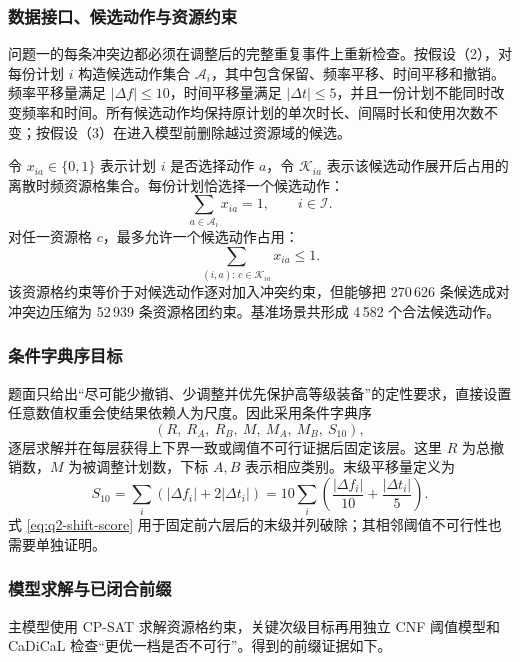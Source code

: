 \subsubsection{数据接口、候选动作与资源约束}
问题一的每条冲突边都必须在调整后的完整重复事件上重新检查。按假设（2），对每份计划 \(i\) 构造候选动作集合 \(\mathcal A_i\)，其中包含保留、频率平移、时间平移和撤销。频率平移量满足 \(\lvert\Delta f\rvert\le 10\)，时间平移量满足 \(\lvert\Delta t\rvert\le 5\)，并且一份计划不能同时改变频率和时间。所有候选动作均保持原计划的单次时长、间隔时长和使用次数不变；按假设（3）在进入模型前删除越过资源域的候选。

令 \(x_{ia}\in\{0,1\}\) 表示计划 \(i\) 是否选择动作 \(a\)，令 \(\mathcal K_{ia}\) 表示该候选动作展开后占用的离散时频资源格集合。每份计划恰选择一个候选动作：
\begin{equation}
\sum_{a\in\mathcal A_i}x_{ia}=1,\qquad i\in\mathcal I.
\label{eq:q2-one-action}
\end{equation}
对任一资源格 \(c\)，最多允许一个候选动作占用：
\begin{equation}
\sum_{(i,a):\,c\in\mathcal K_{ia}}x_{ia}\le 1.
\label{eq:q2-cell-clique}
\end{equation}
该资源格约束等价于对候选动作逐对加入冲突约束，但能够把 270\,626 条候选成对冲突边压缩为 52\,939 条资源格团约束。基准场景共形成 4\,582 个合法候选动作。

\subsubsection{条件字典序目标}
题面只给出“尽可能少撤销、少调整并优先保护高等级装备”的定性要求，直接设置任意数值权重会使结果依赖人为尺度。因此采用条件字典序
\begin{equation}
(R,\ R_A,\ R_B,\ M,\ M_A,\ M_B,\ S_{10}),
\label{eq:q2-lexicographic}
\end{equation}
逐层求解并在每层获得上下界一致或阈值不可行证据后固定该层。这里 \(R\) 为总撤销数，\(M\) 为被调整计划数，下标 \(A,B\) 表示相应类别。末级平移量定义为
\begin{equation}
S_{10}=\sum_i\left(\lvert\Delta f_i\rvert+2\lvert\Delta t_i\rvert\right)
=10\sum_i\left(\frac{\lvert\Delta f_i\rvert}{10}+
\frac{\lvert\Delta t_i\rvert}{5}\right).
\label{eq:q2-shift-score}
\end{equation}
式 \eqref{eq:q2-shift-score} 用于固定前六层后的末级并列破除；其相邻阈值不可行性也需要单独证明。

\subsubsection{模型求解与已闭合前缀}
主模型使用 CP-SAT 求解资源格约束\cite{ortools}，关键次级目标再用独立 CNF 阈值模型和 CaDiCaL\cite{cadical} 检查“更优一档是否不可行”。得到的前缀证据如下。

